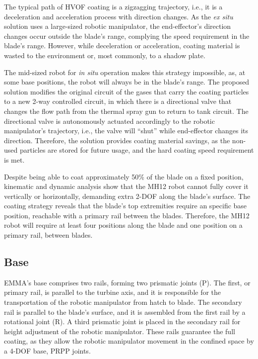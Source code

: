 The typical path of HVOF coating is a zigzagging trajectory,
i.e., it is a deceleration and acceleration process with direction changes. As
the \textit{ex situ} solution uses a large-sized robotic manipulator, the
end-effector's direction changes occur outside the blade's range, complying the
speed requirement in the blade's range. However, while deceleration or
acceleration, coating material is wasted to the environment or, most commonly,
to a shadow plate.

The mid-sized robot for \textit{in situ} operation makes this strategy
impossible, as, at some base positions, the robot will always be in the blade's
range. The proposed solution modifies the original circuit of the gases that
carry the coating particles to a new 2-way controlled circuit, in which there is
a directional valve that changes the flow path from the thermal spray gun to return to tank
circuit. The directional valve is autonomously actuated accordingly to the robotic
manipulator's trajectory, i.e., the valve will ``shut'' while end-effector
changes its direction. Therefore, the solution provides coating material
savings, as the non-used particles are stored for future usage, and the hard
coating speed requirement is met.


Despite being able to coat approximately 50\% of the blade on a fixed
position, kinematic and dynamic analysis show that the MH12 robot cannot fully
cover it vertically or horizontally, demanding extra 2-DOF along the blade's
surface. The coating strategy reveals that the blade's top
extremities require an specific base position, reachable
with a primary rail between the blades. Therefore, the MH12 robot will require
at least four positions along the blade and one position on a primary
rail, between blades. 

\subsection{Base}

EMMA's base comprises two rails, forming two prismatic joints (P). The
first, or primary rail, is parallel to the turbine axis, and it is responsible
for the transportation of the robotic manipulator from hatch to blade. The
secondary rail is parallel to the blade's surface, and it is assembled from the
first rail by a rotational joint (R). A third prismatic joint
is placed in the secondary rail for height adjustment of the robotic
manipulator. These rails guarantee the full coating, as they allow the
robotic manipulator movement in the confined space by a 4-DOF base, PRPP joints.

